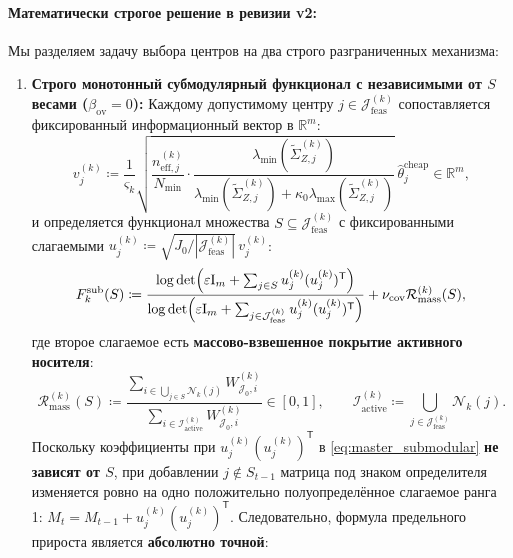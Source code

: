 \documentclass[11pt,a4paper]{article}
\newcommand{\R}{\mathbb{R}}
\newcommand{\Id}{\mathrm{I}}
\newcommand{\T}{^{\mathsf{T}}}
\newcommand{\II}{\mathcal{I}}
\newcommand{\JJJ}{\mathcal{J}}
\theoremstyle{definition}
\theoremstyle{remark}
\begin{document}
\paragraph{Математически строгое решение в ревизии v2:}
Мы разделяем задачу выбора центров на два строго разграниченных механизма:
\begin{enumerate}
    \item \textbf{Строго монотонный субмодулярный функционал с независимыми от $S$ весами ($\beta_{\mathrm{ov}} = 0$):}
    Каждому допустимому центру $j \in \JJJ_{\mathrm{feas}}^{(k)}$ сопоставляется фиксированный информационный вектор в $\R^m$:
    \begin{equation}\label{eq:info_vector_vj}
        v_j^{(k)} \coloneqq \frac{1}{\varsigma_k}\sqrt{\frac{n_{\mathrm{eff},j}^{(k)}}{N_{\min}} \cdot \frac{\lambda_{\min}(\widetilde{\Sigma}_{Z,j}^{(k)})}{\lambda_{\min}(\widetilde{\Sigma}_{Z,j}^{(k)}) + \kappa_0 \lambda_{\max}(\widetilde{\Sigma}_{Z,j}^{(k)})}} \, \hat{\theta}_j^{\mathrm{cheap}} \in \R^m,
    \end{equation}
    и определяется функционал множества $S \subseteq \JJJ_{\mathrm{feas}}^{(k)}$ с фиксированными слагаемыми $u_j^{(k)} \coloneqq \sqrt{J_0 / |\JJJ_{\mathrm{feas}}^{(k)}|} \, v_j^{(k)}$:
    \begin{equation}\label{eq:master_submodular}
        F_k^{\mathrm{sub}}(S) \coloneqq \frac{\log\det\Bigl(\varepsilon \Id_m + \sum_{j \in S} u_j^{(k)}(u_j^{(k)})\T\Bigr)}{\log\det\Bigl(\varepsilon \Id_m + \sum_{j \in \JJJ_{\mathrm{feas}}^{(k)}} u_j^{(k)}(u_j^{(k)})\T\Bigr)} + \nu_{\mathrm{cov}} \mathcal{R}_{\mathrm{mass}}^{(k)}(S),
    \end{equation}
    где второе слагаемое есть \textbf{массово-взвешенное покрытие активного носителя}:
    \begin{equation}\label{eq:mass_coverage_def}
        \mathcal{R}_{\mathrm{mass}}^{(k)}(S) \coloneqq \frac{\sum_{i \in \bigcup_{j \in S}\mathcal{N}_k(j)} W_{\JJJ_0, i}^{(k)}}{\sum_{i \in \II_{\mathrm{active}}^{(k)}} W_{\JJJ_0, i}^{(k)}} \in [0, 1], \qquad \II_{\mathrm{active}}^{(k)} \coloneqq \bigcup_{j \in \JJJ_{\mathrm{feas}}^{(k)}} \mathcal{N}_k(j).
    \end{equation}
    Поскольку коэффициенты при $u_j^{(k)}(u_j^{(k)})\T$ в \eqref{eq:master_submodular} \textbf{не зависят от $S$}, при добавлении $j \notin S_{t-1}$ матрица под знаком определителя изменяется ровно на одно положительно полуопределённое слагаемое ранга 1: $M_t = M_{t-1} + u_j^{(k)}(u_j^{(k)})\T$. Следовательно, формула предельного прироста является \textbf{абсолютно точной}:

\end{enumerate}
\end{document}
